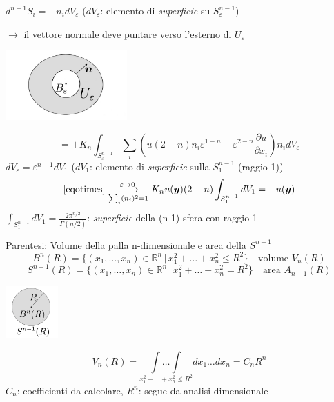 \documentclass[a4paper,11pt]{report}
\newcommand{\Rn}{\mathbb{R}^n}
\newcommand{\y}{\boldsymbol{y}}
\begin{document}
$d^{n-1}S_i= - n_i dV_\varepsilon$ ($dV_\varepsilon$: elemento di \emph{superficie} su $S^{n-1}_\varepsilon$)

$\rightarrow$ il vettore normale deve puntare verso l'esterno di $U_\varepsilon$
\begin{center}
\includegraphics[width=0.35\textwidth]{immagini/insiemeuepsilon2}
\end{center}
\begin{equation}
=+K_n\int_{S_\varepsilon^{n-1}} \sum_i \left(u(2-n)n_i\varepsilon^{1-n}-\varepsilon^{2-n}\frac{\partial u}{\partial x_i}\right)n_i dV_\varepsilon
\tag{$\otimes$}
\label{eqotimes}
\end{equation}
$dV_\varepsilon = \varepsilon^{n-1}dV_1$ ($dV_1$: elemento di \emph{superficie} sulla $S_1^{n-1}$ (raggio 1))
\begin{equation}
\eqref{eqotimes} \underset{\sum_i (n_i)^2=1}{\xrightarrow{\varepsilon \to 0} } K_n u(\y)(2-n)\int_{S_1^{n-1}}dV_1=-u(\y)
\label{2.135}
\end{equation}
$\int_{S_1^{n-1}}dV_1=\frac{2\pi^{n/2}}{\Gamma(n/2)}$: \emph{superficie} della (n-1)-sfera con raggio 1

\medskip

Parentesi: Volume della palla n-dimensionale e area della $S^{n-1}$
\[
B^n(R)=\{(x_1,\dots,x_n)\in \Rn \,| \,x_1^2 + \dots + x_n^2\leq R^2\} \quad \text{volume $V_n(R)$}
\]
\[
S^{n-1}(R)=\{(x_1,\dots,x_n)\in\Rn \,|\, x_1^2 + \dots + x_n^2=R^2 \} \quad \text{area $A_{n-1}(R)$}
\]
\begin{center}
\includegraphics[width=0.15\textwidth]{immagini/palla2}
\end{center}
\begin{equation}
V_n(R)=\underset{x_1^2 + \ldots + x_n^2 \leq R^2}{\int \ldots \int} dx_1\ldots dx_n = C_n R^n 
\label{2.136}
\end{equation}
$C_n$: coefficienti da calcolare, $R^n$: segue da analisi dimensionale
\end{document}
